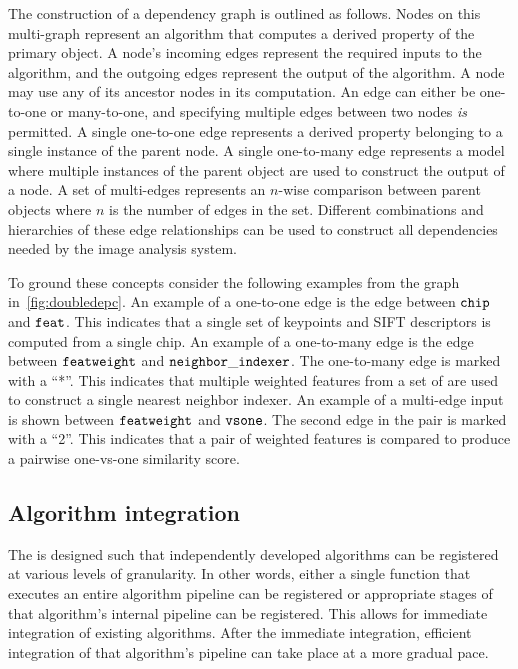     The construction of a dependency graph is outlined as follows.
    Nodes on this multi-graph represent an algorithm that computes a derived
      property of the primary object.
    A node's incoming edges represent the required inputs to the algorithm,
      and the outgoing edges represent the output of the algorithm.
    A node may use any of its ancestor nodes in its computation.
    An edge can either be one-to-one or many-to-one, and specifying multiple
      edges between two nodes \emph{is} permitted.
    A single one-to-one edge represents a derived property belonging to a
      single instance of the parent node.
    A single one-to-many edge represents a model where multiple instances of
      the parent object are used to construct the output of a node.
    A set of multi-edges represents an $n$-wise comparison between parent
      objects where $n$ is the number of edges in the set.
    Different combinations and hierarchies of these edge relationships can be
      used to construct all dependencies needed by the image analysis system.

    To ground these concepts consider the following examples from the graph
      in~\cref{fig:doubledepc}.
    An example of a one-to-one edge is the edge between  $\tt{chip}$ and
      $\tt{feat}$.
    This indicates that a single set of keypoints and SIFT descriptors is
      computed from a single chip.
    An example of a one-to-many edge is the edge between $\tt{featweight}$ and
      $\tt{neighbor\_indexer}$.
    The one-to-many edge is marked with a ``*''.
    This indicates that multiple weighted features from a set of \annots{} are
      used to construct a single nearest neighbor indexer.
    An example of a multi-edge input is shown between $\tt{featweight}$ and
      $\tt{vsone}$.
    The second edge in the pair is marked with a ``2''.
    This indicates that a pair of weighted features is compared to produce a
      pairwise one-vs-one similarity score.


    \subsection{Algorithm integration}
    The \depcache{} is designed such that independently developed algorithms
      can be registered at various levels of granularity.
    In other words, either a single function that executes an entire algorithm
      pipeline can be registered or appropriate stages of that algorithm's
      internal pipeline can be registered.
    This allows for immediate integration of existing algorithms.
    After the immediate integration, efficient integration of that algorithm's
      pipeline can take place at a more gradual pace.

